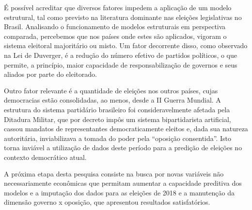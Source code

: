 \documentclass[
	article,			%
	11pt,				%
	oneside,			%
	a4paper,			%
	english,			%
	brazil,				%
	sumario=tradicional
	]{abntex2}
\begin{document}
É possível acreditar que diversos fatores impedem a aplicação de um modelo estrutural, tal como previsto na literatura dominante nas eleições legislativas no Brasil. Analisando o funcionamento de modelos estruturais em perspectiva comparada, percebemos que nos países onde estes são aplicados, vigoram o sistema eleitoral majoritário ou misto. Um fator decorrente disso, como observado na Lei de Duverger, é a redução do número efetivo de partidos políticos, o que permite, a princípio, maior capacidade de responsabilização de governos  e seus aliados por parte do eleitorado.

Outro fator relevante é a quantidade de eleições nos outros países, cujas democracias estão consolidadas, ao menos, desde a II Guerra Mundial. A estrutura do sistema partidário brasileiro foi consideravelmente afetada pela Ditadura Militar, que por decreto impôs um sistema bipartidarista artificial, cassou mandatos de representantes democraticamente eleitos e, dada sua natureza autoritária, inviabilizava a tomada do poder pela ``oposição consentida''. Isto torna inviável a utilização de dados deste período para a predição de eleições no contexto democrático atual.

A próxima etapa desta pesquisa consiste na busca por novas variáveis não necessariamente econômicas que permitam aumentar a capacidade preditiva dos modelos e a imputação dos dados para as eleições de 2018 e a manutenção da dimensão governo x oposição, que apresentou resultados satisfatórios.


\end{document}
